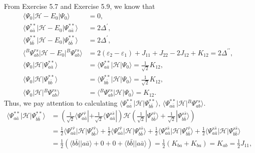 \documentclass[a4paper]{book}
\newcounter{solution}[chapter]
\begin{document}
	\begin{solution}
	
	From Exercise 5.7 and Exercise 5.9, we know that
	\begin{align*}
		\langle \Psi_0 | \mathscr{H} - E_0 | \Psi_0 \rangle &= 0 , \\
		\langle \Psi^{**}_{a\bar{a}} | \mathscr{H} - E_0 | \Psi^{**}_{a\bar{a}} \rangle &= 2 \Delta^\prime , \\
		\langle \Psi^{**}_{b\bar{b}} | \mathscr{H} - E_0 | \Psi^{**}_{b\bar{b}} \rangle &= 2 \Delta^\prime , \\
		\langle {}^B \Psi^{rs}_{ab} | \mathscr{H} - E_0 | {}^B \Psi^{rs}_{ab} \rangle &= 2( \varepsilon_2 - \varepsilon_1 ) + J_{11} + J_{22} - 2J_{12} + K_{12} = 2 \Delta^{\prime\prime} , \\
		\langle \Psi_0 | \mathscr{H} | \Psi^{**}_{a\bar{a}} \rangle &= \langle \Psi^{**}_{a\bar{a}} | \mathscr{H} | \Psi_0 \rangle = \frac{1}{ \sqrt{2} } K_{12} , \\
		\langle \Psi_0 | \mathscr{H} | \Psi^{**}_{b \bar{b}} \rangle &= \langle \Psi^{**}_{b \bar{b}} | \mathscr{H} | \Psi_0 \rangle = \frac{1}{ \sqrt{2} } K_{12} , \\
		\langle \Psi_0 | \mathscr{H} | {}^B \Psi^{rs}_{ab} \rangle &= \langle {}^B \Psi^{rs}_{ab} | \mathscr{H} | \Psi_0 \rangle = K_{12} .				
	\end{align*}
	Thus, we pay attention to calculating $\langle \Psi^{**}_{a\bar{a}} | \mathscr{H} | \Psi^{**}_{b\bar{b}} \rangle$, $\langle \Psi^{**}_{a\bar{a}} | \mathscr{H} | {}^B \Psi^{rs}_{ab} \rangle$.
	\begin{align*}
		\langle \Psi^{**}_{a\bar{a}} | \mathscr{H} | \Psi^{**}_{b\bar{b}} \rangle &= \left( \frac{1}{ \sqrt{2} } \langle \Psi^{r \bar{r}}_{a \bar{a}} | + \frac{1}{ \sqrt{2} } \langle \Psi^{s \bar{s}}_{a \bar{a}} | \right) \mathscr{H} \left( \frac{1}{ \sqrt{2} } | \Psi^{r \bar{r}}_{ b \bar{b}} \rangle + \frac{1}{ \sqrt{2} } | \Psi^{s \bar{s}}_{ b \bar{b}} \rangle \right) \\
		&= \frac{1}{2} \langle \Psi^{r \bar{r}}_{a \bar{a}} | \mathscr{H} | \Psi^{r \bar{r}}_{ b \bar{b}} \rangle + \frac{1}{2} \langle \Psi^{r \bar{r}}_{a \bar{a}} | \mathscr{H} | \Psi^{s \bar{s}}_{ b \bar{b}} \rangle + \frac{1}{2} \langle \Psi^{s \bar{s}}_{a \bar{a}} | \mathscr{H} | \Psi^{r \bar{r}}_{ b \bar{b}} \rangle + \frac{1}{2} \langle \Psi^{s \bar{s}}_{a \bar{a}} | \mathscr{H} | \Psi^{s \bar{s}}_{ b \bar{b}} \rangle \\
		&= \frac{1}{2} \left( \langle b \bar{b} || a \bar{a} \rangle + 0 + 0 + \langle b \bar{b} || a \bar{a} \rangle \right) = \frac{1}{2} \left( K_{ba} + K_{ba} \right) = K_{ab} = \frac{1}{2} J_{11}, \\

\end{align*}
\end{solution}
\end{document}
